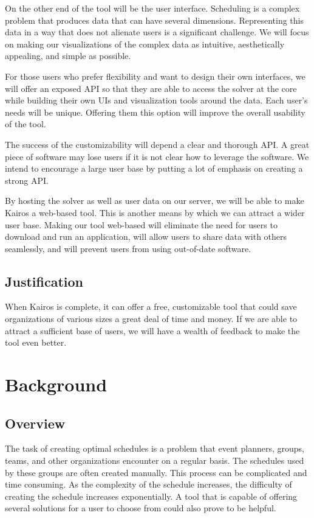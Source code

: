 \documentclass{extarticle}
\begin{document}
On the other end of the tool will be the user interface.  Scheduling is a complex problem that produces data that
can have several dimensions.  Representing this data in a way that does not alienate users is a significant
challenge.  We will focus on making our visualizations of the complex data as intuitive, aesthetically appealing,
and simple as possible.

For those users who prefer flexibility and want to design their own interfaces, we will offer an exposed API so
that they are able to access the solver at the core while building their own UIs and visualization tools around
the data.  Each user's needs will be unique.  Offering them this option will improve the overall usability of the
tool.

The success of the customizability will depend a clear and thorough API.  A great piece of software may lose
users if it is not clear how to leverage the software.  We intend to encourage a large user base by putting a lot
of emphasis on creating a strong API.

By hosting the solver as well as user data on our server, we will be able to make Kairos a web-based tool.  This is
another means by which we can attract a wider user base.  Making our tool web-based will eliminate the need for
users to download and run an application, will allow users to share data with others seamlessly, and will prevent
users from using out-of-date software.

\subsection{Justification}
When Kairos is complete, it can offer a free, customizable tool that could save organizations of various sizes
a great deal of time and money.  If we are able to attract a sufficient base of users, we will have a wealth of
feedback to make the tool even better.

\section{Background}

\subsection{Overview} %
The task of creating optimal schedules is a problem that event planners, groups, teams, and other organizations
encounter on a regular basis.  The schedules used by these groups are often created manually.  This process can be
complicated and time consuming.  As the complexity of the schedule increases, the difficulty of creating the
schedule increases exponentially.  A tool that is capable of offering several solutions for a user to choose from
could also prove to be helpful.
\end{document}
